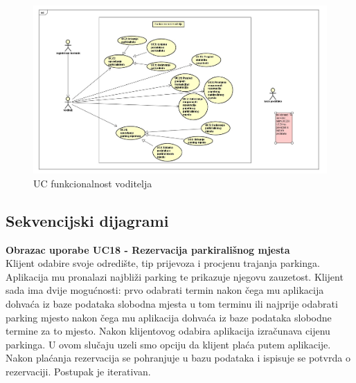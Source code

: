 \begin{packed_item}
				   \begin{figure}[H]
				   	\includegraphics[width=\textwidth]{slike/Voditelj.jpeg} %
				   	\caption{UC funkcionalnost voditelja}
				   	\label{fig:voditelj}
				   \end{figure}
				\eject		

				
			\subsection{Sekvencijski dijagrami}
				
				\textbf{Obrazac uporabe UC18 - Rezervacija parkirališnog mjesta}\\
				
				Klijent odabire svoje odredište, tip prijevoza i procjenu trajanja parkinga. Aplikacija mu pronalazi najbliži parking te prikazuje njegovu zauzetost. Klijent sada ima dvije mogućnosti: prvo odabrati termin nakon čega mu aplikacija dohvaća iz baze podataka slobodna mjesta u tom terminu ili najprije odabrati parking mjesto nakon čega mu aplikacija dohvaća iz baze podataka slobodne termine za to mjesto. Nakon klijentovog odabira aplikacija izračunava cijenu parkinga. U ovom slučaju uzeli smo opciju da klijent plaća putem aplikacije. Nakon plaćanja rezervacija se pohranjuje u bazu podataka i ispisuje se potvrda o rezervaciji. Postupak je iterativan. 
				\eject	
						

\end{packed_item}
